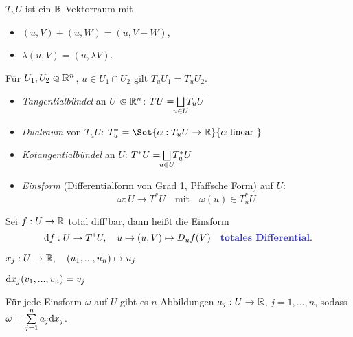 \documentclass{cheat-sheet}
\theoremstyle{definition}
\begin{document}
\begin{bem}
  $T_u U$ ist ein $\mathbb{R}$-Vektorraum mit
  \begin{multicols}{2}
    \begin{itemize}
      \item $(u, V) + (u, W) = (u, V + W)$,
      \item $\lambda (u, V) = (u, \lambda V)$.
    \end{itemize}
  \end{multicols}
\end{bem}

\begin{bem}
  Für $U_1, U_2 \opn \R^n$, $u \in U_1 \cap U_2$ gilt $T_u U_1 = T_u U_2$.
\end{bem}

\begin{defn}
  \begin{itemize}
    \item \emph{Tangentialbündel} an $U \opn \R^n$: $TU = \bigsqcup_{\mathclap{u \in U}} T_u U$
    \item \emph{Dualraum} von $T_u U$: $T_u^* = \Set{ \alpha : T_u U \to \R }{ \alpha \text{ linear } }$
    \item \emph{Kotangentialbündel} an $U$: $T^* U = \bigsqcup_{\mathclap{u \in U}} T_u^* U$
    \item \emph{Einsform} (Differentialform von Grad 1, Pfaffsche Form) auf $U$:
\[ \omega : U \to T^*U \quad \text{mit} \quad \omega(u) \in T_u^*U \]
  \end{itemize}
\end{defn}


\begin{bsp}
  Sei $f : U \to \mathbb{R}$ total diff'bar, dann heißt die Einsform
  \[ \d f : U \to T^*U, \quad u \mapsto (u, V) \mapsto D_u f (V) \quad \text{\emph{totales Differential}.} \]
\end{bsp}

\begin{nota}
  $x_j : U \to \mathbb{R}, \quad (u_1, ..., u_n) \mapsto u_j$ %
\end{nota}

\begin{bem}
  $\mathrm{d} x_j (v_1, ..., v_n) = v_j$
\end{bem}


\iffalse %
\begin{beobachtung}
  Für jede Einsform $\omega$ auf $U$ gibt es $n$ Abbildungen $a_j : U \to \mathbb{R}$, $j = 1, ..., n$, sodass $\omega = \sum_{j=1}^n a_j \d x_j$.
\end{beobachtung}
\end{document}
